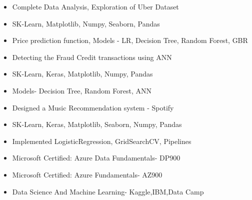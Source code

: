 \documentclass[10pt,a4paper,ragged2e]{altacv}
\begin{document}
\divider

\begin{itemize}
\item Complete Data Analysis, Exploration of Uber Dataset
\item SK-Learn, Matplotlib, Numpy, Seaborn, Pandas
\item Price prediction function, Models - LR, Decision Tree, Random Forest, GBR
\end{itemize}

\divider

\begin{itemize}
\item Detecting the Fraud Credit transactions using ANN
\item SK-Learn, Keras, Matplotlib, Numpy, Pandas
\item Models- Decision Tree, Random Forest, ANN


\end{itemize}

\divider


\begin{itemize}
\item Designed a Music Recommendation system - Spotify
\item SK-Learn, Keras, Matplotlib, Seaborn, Numpy, Pandas
\item Implemented LogisticRegression, GridSearchCV, Pipelines

\end{itemize}










\begin{itemize}
   \item Microsoft Certified: Azure Data Fundamentals- DP900
    \item Microsoft Certified: Azure Fundamentals- AZ900
    \item Data Science And Machine Learning- Kaggle,IBM,Data Camp
 
   
   
\end{itemize}
\end{document}
